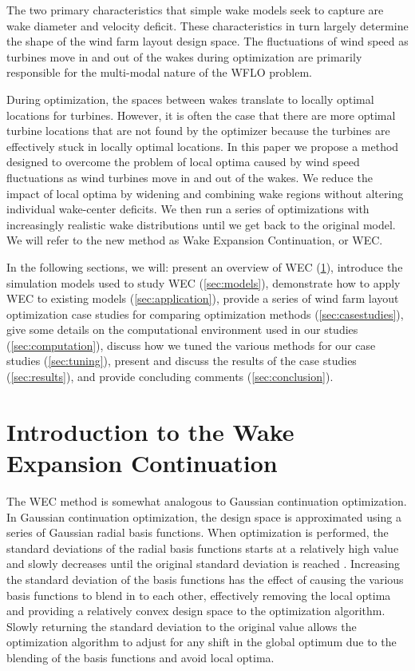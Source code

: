 \documentclass{jpconf}
\begin{document}
The two primary characteristics that simple wake models seek to capture are wake diameter and velocity deficit. These characteristics in turn largely determine the shape of the wind farm layout design space. The fluctuations of wind speed as turbines move in and out of the wakes during optimization are primarily responsible for the multi-modal nature of the WFLO problem. 

During optimization, the spaces between wakes translate to locally optimal locations for turbines. However, it is often the case that there are more optimal turbine locations that are not found by the optimizer because the turbines are effectively stuck in locally optimal locations. In this paper we propose a method designed to overcome the problem of local optima caused by wind speed fluctuations as wind turbines move in and out of the wakes. We reduce the impact of local optima by widening and combining wake regions without altering individual wake-center deficits. We then run a series of optimizations with increasingly realistic wake distributions until we get back to the original model. We will refer to the new method as Wake Expansion Continuation, or WEC. 

In the following sections, we will: present an overview of WEC (\cref{sec:introwec}), introduce the simulation models used to study WEC (\cref{sec:models}), demonstrate how to apply WEC to existing models (\cref{sec:application}), provide a series of wind farm layout optimization case studies for comparing optimization methods (\cref{sec:casestudies}), give some details on the computational environment used in our studies (\cref{sec:computation}), discuss how we tuned the various methods for our case studies (\cref{sec:tuning}), present and discuss the results of the case studies (\cref{sec:results}), and provide concluding comments (\cref{sec:conclusion}).

\section{Introduction to the Wake Expansion Continuation}\label{sec:introwec}

The WEC method is somewhat analogous to Gaussian continuation optimization. In Gaussian continuation optimization, the design space is approximated using a series of Gaussian radial basis functions. When optimization is performed, the standard deviations of the radial basis functions starts at a relatively high value and slowly decreases until the original standard deviation is reached \cite{mobahi2015}. Increasing the standard deviation of the basis functions has the effect of causing the various basis functions to blend in to each other, effectively removing the local optima and providing a relatively convex design space to the optimization algorithm. Slowly returning the standard deviation to the original value allows the optimization algorithm to adjust for any shift in the global optimum due to the blending of the basis functions and avoid local optima. 
\end{document}
